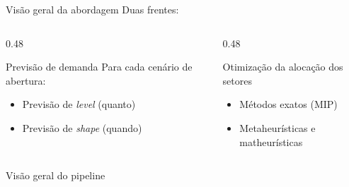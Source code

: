 \documentclass[aspectratio=169,11pt]{beamer}
\begin{document}
\begin{frame}{Visão geral da abordagem}
  Duas frentes:
\begin{columns}[T]
    \begin{column}{0.48\textwidth}
        \begin{block}{Previsão de demanda}
            Para cada cenário de abertura:
            \begin{itemize}
                \item Previsão de \textit{level} (quanto)
                \item Previsão de \textit{shape} (quando)
            \end{itemize}
        \end{block}
    \end{column}

    \begin{column}{0.48\textwidth}
        \begin{block}{Otimização da alocação dos setores}
            \begin{itemize}
                \item Métodos exatos (MIP)
                \item Metaheurísticas e matheurísticas
            \end{itemize}
        \end{block}
    \end{column}
\end{columns}
\end{frame}

\begin{frame}{Visão geral do pipeline}
  
\end{frame}


\end{document}
